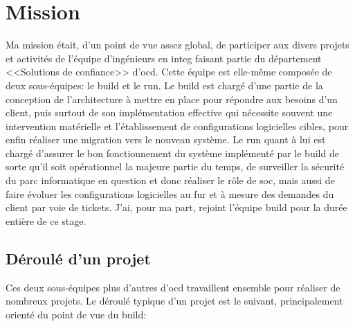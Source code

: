 \documentclass[12pt, oneside, a4paper, titlepage]{report}
\begin{document}
\chapter{Mission}%
\label{cha:mission}

Ma mission était, d'un point de vue assez global, de participer aux divers
projets et activités de l'équipe d'ingénieurs en \gls{integ} faisant partie du
département <<Solutions de confiance>> d'\acrlong{ocd}. Cette équipe est
elle-même composée de deux sous-équipes: le \gls{build} et le \gls{run}.  Le
\gls{build} est chargé d'une partie de la conception de l'architecture à mettre
en place pour répondre aux besoins d'un client, puis surtout de son
implémentation effective qui nécessite souvent une intervention matérielle et
l'établissement de configurations logicielles cibles, pour enfin réaliser une
migration vers le nouveau système. Le \gls{run} quant à lui est chargé d'assurer
le bon fonctionnement du système implémenté par le \gls{build} de sorte qu'il
soit opérationnel la majeure partie du temps, de surveiller la sécurité du parc
informatique en question et donc réaliser le rôle de \gls{soc}, mais aussi de
faire évoluer les configurations logicielles au fur et à mesure des demandes du
client par voie de tickets. J'ai, pour ma part, rejoint l'équipe \gls{build}
pour la durée entière de ce stage.


\section{Déroulé d'un projet}%
\label{sec:mission::deroule-projet}

Ces deux sous-équipes plus d'autres d'\gls{ocd} travaillent ensemble pour
réaliser de nombreux projets. Le déroulé typique d'un projet est le suivant,
principalement orienté du point de vue du \gls{build}:
\end{document}
